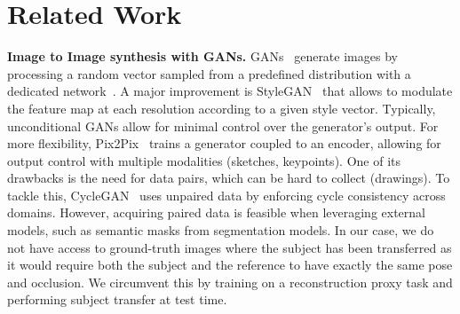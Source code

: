 \documentclass[runningheads]{llncs}
\begin{document}
 
\section{Related Work}
\label{sec:relatedwork}
\begin{comment}

\noindent \textbf{Image Generation with GANs.} Generative Adversarial Networks~\cite{goodfellow2014generative}  generate images from a given distribution~\cite{lapgan,dcgan,karras2018progressive}. A major improvement is StyleGAN~\cite{karras2019stylebased,karras2020analyzing,Karras2021} that proposes a normalization technique allowing to modulate the feature map at each resolution according to a given style vector. 
The GANsformer~\cite{hudson2021generative} improves this modulation by exploiting multiple style codes with cross attention between style vectors and feature maps. It also shows the emergence of semantic structure with the specialization of latents based on different semantically meaningful objects.

\end{comment}

\noindent \textbf{Image to Image synthesis with GANs.} 
GANs~\cite{goodfellow2014generative} generate images by processing a random vector sampled from a predefined distribution with a dedicated network~\cite{lapgan,dcgan,karras2018progressive}. A major improvement is StyleGAN~\cite{karras2019stylebased,karras2020analyzing} that allows to modulate the feature map at each resolution according to a given style vector. 
Typically, unconditional GANs allow for minimal control over the generator's output. For more flexibility, Pix2Pix~\cite{isola2018imagetoimage,wang2018pix2pixHD} trains a generator coupled to an encoder, allowing for output control with multiple modalities (sketches, keypoints). One of its drawbacks is the need for data pairs, which can be hard to collect (drawings).  
To tackle this, CycleGAN~\cite{zhu2020unpaired} uses unpaired data by enforcing cycle consistency across domains. 
However, acquiring paired data is feasible when leveraging external models, such as semantic masks from segmentation models. In our case, we do not have access to ground-truth images where the subject has been transferred as it would require both the subject and the reference to have exactly the same pose and occlusion. 
We circumvent this by training on a reconstruction proxy task and performing subject transfer at test time.
\end{document}

